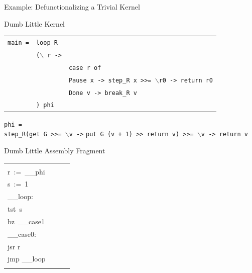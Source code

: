 \documentclass{beamer}
\begin{document}
\begin{frame}{Example: Defunctionalizing a Trivial Kernel}

\begin{structure}{Dumb Little Kernel}

\begin{footnotesize}

\begin{tabular}[t]{lll}


\texttt{main =}&\texttt{loop\_R}\\

&\texttt{($\backslash$ r\ ->}\\

&&\texttt{case\ r\ of}\\
&&\texttt{Pause\ x\ -> step\_R\ x\ >>=\ $\backslash$r0\ ->\  return\ r0}\\
&&\texttt{Done\ v\ -> break\_R\ v}\\

&\texttt{)\ phi}\\

\end{tabular}

\texttt{phi\ =}\\
\texttt{step\_R(get\ G\ >>= $\backslash$v\ ->}
\texttt{put\ G\ (v + 1)\ >>\ return\ v)\ >>=\ $\backslash$v\ -> return\ v}\\

\end{footnotesize}

\end{structure}

\bigskip

\begin{structure}{Dumb Little Assembly Fragment}

\begin{footnotesize}


\begin{tabular}[t]{llll}

\begin{minipage}[l]{2cm}
\begin{texttt}
\_\_main:\\
r\ :=\ \_\_phi\\
s\ :=\ 1\\
\_\_loop:\\
tst\ s\\
bz\ \_\_case1\\
\_\_case0:\\
jsr r\\
jmp \_\_loop\\


\end{texttt}
\end{minipage}
\end{tabular}
\end{footnotesize}
\end{structure}
\end{frame}
\end{document}
